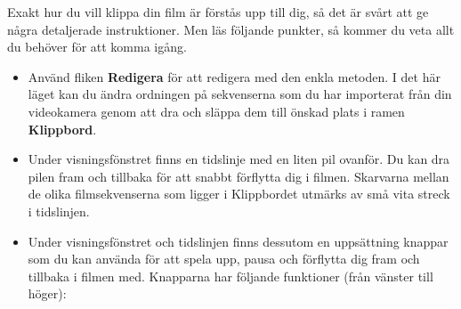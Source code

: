 \documentclass[a4paper,final]{memoir} %
\begin{document}
Exakt hur du vill klippa din film är förstås upp till dig, så det är svårt att ge några detaljerade instruktioner. Men läs följande punkter, så kommer du veta allt du behöver för att komma igång.

\begin{itemize}

\item Använd fliken \textbf{Redigera} för att redigera med den enkla metoden. I det här läget kan du ändra ordningen på sekvenserna som du har importerat från din videokamera genom att dra och släppa dem till önskad plats i ramen \textbf{Klippbord}.

\item Under visningsfönstret finns en tidslinje med en liten pil ovanför. Du kan dra pilen fram och tillbaka för att snabbt förflytta dig i filmen. Skarvarna mellan de olika filmsekvenserna som ligger i Klippbordet utmärks av små vita streck i tidslinjen.

\item Under visningsfönstret och tidslinjen finns dessutom   en uppsättning knappar som du kan använda för att spela upp, pausa och förflytta dig fram och tillbaka i filmen med. Knapparna har följande funktioner (från vänster till höger):

\begin{itemize}











\end{itemize}
\end{itemize}
\end{document}
